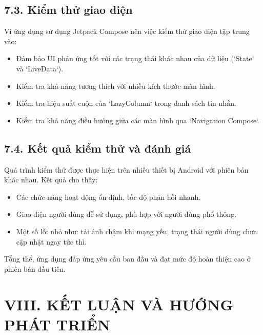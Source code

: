 \documentclass[12pt,a4paper]{article}
\begin{document}
	\vspace{0.7cm}
	
	\subsection*{7.3. Kiểm thử giao diện}
	\vspace{0.1cm}
	
	\noindent
	Vì ứng dụng sử dụng Jetpack Compose nên việc kiểm thử giao diện tập trung vào:
	\begin{itemize}
		\item Đảm bảo UI phản ứng tốt với các trạng thái khác nhau của dữ liệu (`State` và `LiveData`).
		\item Kiểm tra khả năng tương thích với nhiều kích thước màn hình.
		\item Kiểm tra hiệu suất cuộn của `LazyColumn` trong danh sách tin nhắn.
		\item Kiểm tra khả năng điều hướng giữa các màn hình qua `Navigation Compose`.
	\end{itemize}
	
	\vspace{0.7cm}
	
	\subsection*{7.4. Kết quả kiểm thử và đánh giá}
	\vspace{0.1cm}
	
	\noindent
	Quá trình kiểm thử được thực hiện trên nhiều thiết bị Android với phiên bản khác nhau. Kết quả cho thấy:
	\begin{itemize}
		\item Các chức năng hoạt động ổn định, tốc độ phản hồi nhanh.
		\item Giao diện người dùng dễ sử dụng, phù hợp với người dùng phổ thông.
		\item Một số lỗi nhỏ như: tải ảnh chậm khi mạng yếu, trạng thái người dùng chưa cập nhật ngay tức thì.
	\end{itemize}
	Tổng thể, ứng dụng đáp ứng yêu cầu ban đầu và đạt mức độ hoàn thiện cao ở phiên bản đầu tiên.
	
	\vspace{0.5cm}
	
	\section*{VIII. KẾT LUẬN VÀ HƯỚNG PHÁT TRIỂN}
	\vspace{0.5cm}
	
\end{document}
